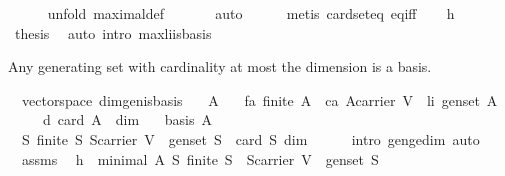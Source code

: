 \begin{isabellebody}
\ \ \ \ \isamarkupfalse%
\ {\isacharparenleft}unfold\ maximal{\isacharunderscore}def{\isacharparenright}\ \isanewline
\ \ \ \ \isamarkupfalse%
\ auto\isanewline
\ \ \ \ \isamarkupfalse%
\ {\isacharparenleft}metis\ card{\isacharunderscore}seteq\ eq{\isacharunderscore}iff{\isacharparenright}\isanewline
\ \ \isamarkupfalse%
\ h{}\ \isamarkupfalse%
\ {\isacharquery}thesis\ \isamarkupfalse%
\ {\isacharparenleft}auto\ intro{\isacharcolon}\ max{\isacharunderscore}li{\isacharunderscore}is{\isacharunderscore}basis{\isacharparenright}\isanewline
{}\isamarkupfalse%
%
\endisatagproof
{\isafoldproof}%
%
\isadelimproof
%
\endisadelimproof
%
\begin{isamarkuptext}%
Any generating set with cardinality at most the dimension is a basis.%
\end{isamarkuptext}%
\isamarkuptrue%
\isamarkupfalse%
\ {\isacharparenleft}\ vectorspace{\isacharparenright}\ dim{\isacharunderscore}gen{\isacharunderscore}is{\isacharunderscore}basis{\isacharcolon}\isanewline
\ \ \ A\isanewline
\ \ \ fa{\isacharcolon}\ {\isachardoublequoteopen}finite\ A{\isachardoublequoteclose}\ \ ca{\isacharcolon}\ {\isachardoublequoteopen}A{\isasymsubseteq}carrier\ V{\isachardoublequoteclose}\ \ li{\isacharcolon}\ {\isachardoublequoteopen}gen{\isacharunderscore}set\ A{\isachardoublequoteclose}\ \isanewline
\ \ \ \ \ d{\isacharcolon}\ {\isachardoublequoteopen}card\ A\ {\isasymle}\ dim{\isachardoublequoteclose}\isanewline
\ \ \ {\isachardoublequoteopen}basis\ A{\isachardoublequoteclose}\isanewline
%
\isadelimproof
%
\endisadelimproof
%
\isatagproof
{}\isamarkupfalse%
\ {\isacharminus}\ \isanewline
\ \ \isamarkupfalse%
\ {}{\isacharcolon}\ {\isachardoublequoteopen}{\isasymAnd}S{\isachardot}\ finite\ S{\isasymand}\ S{\isasymsubseteq}carrier\ V\ {\isasymand}\ gen{\isacharunderscore}set\ S\ {\isasymLongrightarrow}\ card\ S\ {\isasymge}dim{\isachardoublequoteclose}\isanewline
\ \ \ \ \isamarkupfalse%
\ {\isacharparenleft}intro\ gen{\isacharunderscore}ge{\isacharunderscore}dim{\isacharcomma}\ auto{\isacharparenright}\isanewline
\isanewline
\ \ \isamarkupfalse%
\ {}\ assms\ \isamarkupfalse%
\ h{}{\isacharcolon}\ \ {\isachardoublequoteopen}minimal\ A\ {\isacharparenleft}{\isasymlambda}S{\isachardot}\ finite\ S\ {\isasymand}\ S{\isasymsubseteq}carrier\ V\ {\isasymand}\ gen{\isacharunderscore}set\ S{\isacharparenright}{\isachardoublequoteclose}\isanewline

\end{isabellebody}
